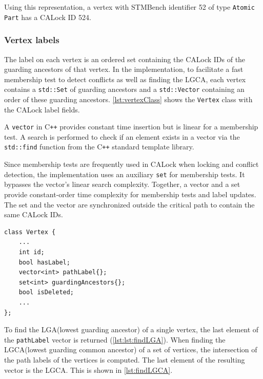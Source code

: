 Using this representation, a vertex with STMBench identifier 52 of type \texttt{Atomic Part} has a CALock ID 524.

\subsubsection{Vertex labels}

The label on each vertex is an ordered set containing the CALock IDs of the guarding ancestors of that vertex. In the implementation, to facilitate a fast membership test to detect conflicts as well as finding the LGCA, each vertex contains a \texttt{std::Set} of guarding ancestors and a \texttt{std::Vector} containing an order of these guarding ancestors.  \cref{lst:vertexClass} shows the \texttt{Vertex} class with the CALock label fields.

A \texttt{vector} in C\texttt{++} provides constant time insertion but is linear for a membership test. A search is performed to check if an element exists in a vector via the \texttt{std::find} function from the C\texttt{++} standard template library.

Since membership tests are frequently used in CALock when locking and conflict detection, the implementation uses an auxiliary \texttt{set} for membership tests. It bypasses the vector's linear search complexity. Together, a vector and a set provide constant-order time complexity for membership tests and label updates. The set and the vector are synchronized outside the critical path to contain the same CALock IDs.

\begin{lstlisting}[caption={Vertex class with CALock label fields}, label={lst:vertexClass}]
class Vertex {
    ...
    int id;
    bool hasLabel;
    vector<int> pathLabel{};
    set<int> guardingAncestors{};
    bool isDeleted;
    ...
};

\end{lstlisting}


To find the LGA(lowest guarding ancestor) of a single vertex, the last element of the \lstinline{pathLabel} vector is returned (\cref{lst:lst:findLGA}). When finding the LGCA(lowest guarding common ancestor) of a set of vertices, the intersection of the path labels of the vertices is computed. The last element of the resulting vector is the LGCA. This is shown in \cref{lst:findLGCA}.

